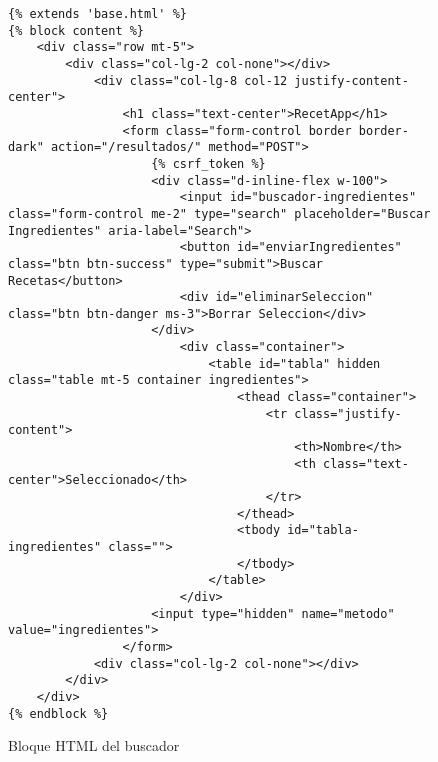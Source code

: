 \begin{figure}[H]
\begin{lstlisting}[style=consola]
{% extends 'base.html' %}
{% block content %}
    <div class="row mt-5">
        <div class="col-lg-2 col-none"></div>
            <div class="col-lg-8 col-12 justify-content-center">
                <h1 class="text-center">RecetApp</h1>
                <form class="form-control border border-dark" action="/resultados/" method="POST">
                    {% csrf_token %}
                    <div class="d-inline-flex w-100">
                        <input id="buscador-ingredientes" class="form-control me-2" type="search" placeholder="Buscar Ingredientes" aria-label="Search">
                        <button id="enviarIngredientes" class="btn btn-success" type="submit">Buscar Recetas</button>
                        <div id="eliminarSeleccion" class="btn btn-danger ms-3">Borrar Seleccion</div>
                    </div>
                        <div class="container">
                            <table id="tabla" hidden class="table mt-5 container ingredientes">
                                <thead class="container">
                                    <tr class="justify-content">
                                        <th>Nombre</th>
                                        <th class="text-center">Seleccionado</th>
                                    </tr>
                                </thead>
                                <tbody id="tabla-ingredientes" class="">
                                </tbody>
                            </table>
                        </div> 
                    <input type="hidden" name="metodo" value="ingredientes">
                </form>
            <div class="col-lg-2 col-none"></div>
        </div>
    </div>
{% endblock %}
\end{lstlisting}
\caption{Bloque HTML del buscador}
\label{sni:buscador}
\end{figure}

